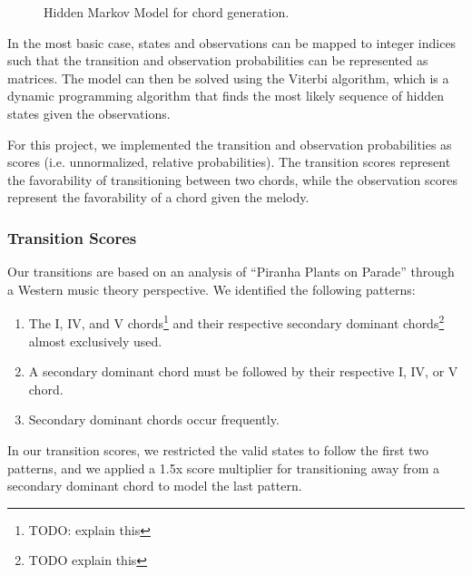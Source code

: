 \begin{figure}
    \centering
    \caption{Hidden Markov Model for chord generation.}
    \label{fig:hmm}
\end{figure}

In the most basic case, states and observations can be mapped to integer indices such that the transition and observation probabilities can be represented as matrices. The model can then be solved using the Viterbi \autocite{TODO: cite here} algorithm, which is a dynamic programming algorithm that finds the most likely sequence of hidden states given the observations.

For this project, we implemented the transition and observation probabilities as scores (i.e. unnormalized, relative probabilities). The transition scores represent the favorability of transitioning between two chords, while the observation scores represent the favorability of a chord given the melody.

\subsubsection{Transition Scores}

Our transitions are based on an analysis of ``Piranha Plants on Parade'' through a Western music theory perspective. We identified the following patterns:
\begin{enumerate}
    \item The I, IV, and V chords\footnote{TODO: explain this} and their respective secondary dominant chords\footnote{TODO explain this} almost exclusively used.
    \item A secondary dominant chord must be followed by their respective I, IV, or V chord.
    \item Secondary dominant chords occur frequently.
\end{enumerate}
In our transition scores, we restricted the valid states to follow the first two patterns, and we applied a 1.5x score multiplier for transitioning away from a secondary dominant chord to model the last pattern.

